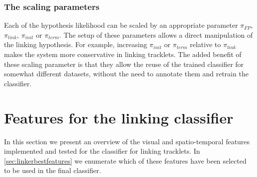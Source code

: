 		\subsubsection{The scaling parameters \statusfirstdraft}
		
		Each of the hypothesis likelihood can be scaled by an appropriate parameter $\pi_{FP}$, $\pi_{link}$, $\pi_{init}$ or $\pi_{term}$. The setup of these parameters allows a direct manipulation of the linking hypothesis. For example, increasing $\pi_{init}$ or $\pi_{term}$ relative to $\pi_{link}$ makes the system more conservative in linking tracklets. The added benefit of these scaling parameter is that they allow the reuse of the trained classifier for somewhat different datasets, without the need to annotate them and retrain the classifier.
	
 	\section{Features for the linking classifier \statusoutline}
 		\label{sec:linkerclassifierfeatures}
 		
 		In this section we present an overview of the visual and spatio-temporal features implemented and tested for the classifier for linking tracklets. In \cref{sec:linkerbestfeatures} we enumerate which of these features have been selected to be used in the final classifier. 
 		
